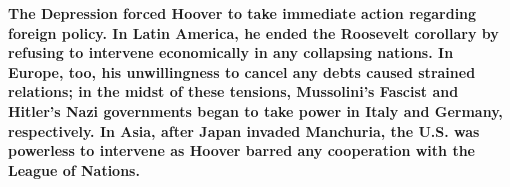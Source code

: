 \documentclass[a4paper]{article}
\begin{document}
{\begin{itemize}
        \end{itemize}
        \textbf{The Depression forced Hoover to take immediate action regarding foreign policy. In Latin America, he ended the Roosevelt corollary by refusing to intervene economically in any collapsing nations. In Europe, too, his unwillingness to cancel any debts caused strained relations; in the midst of these tensions, Mussolini's Fascist and Hitler's Nazi governments began to take power in Italy and Germany, respectively. In Asia, after Japan invaded Manchuria, the U.S. was powerless to intervene as Hoover barred any cooperation with the League of Nations.}}
    
\end{document}
